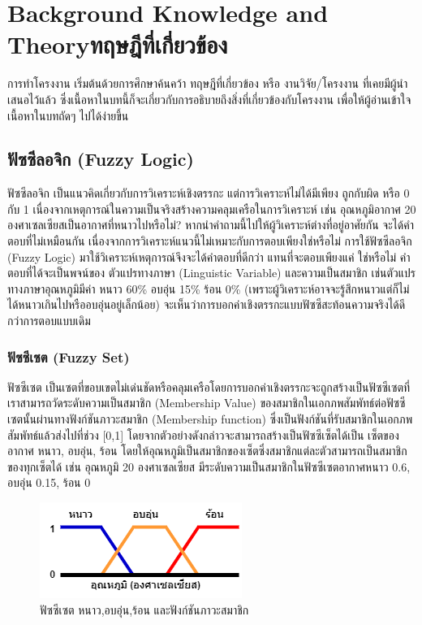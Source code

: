 \chapter{\ifenglish Background Knowledge and Theory\else ทฤษฎีที่เกี่ยวข้อง\fi}

การทำโครงงาน เริ่มต้นด้วยการศึกษาค้นคว้า ทฤษฎีที่เกี่ยวข้อง หรือ งานวิจัย/โครงงาน ที่เคยมีผู้นำเสนอไว้แล้ว ซึ่งเนื้อหาในบทนี้ก็จะเกี่ยวกับการอธิบายถึงสิ่งที่เกี่ยวข้องกับโครงงาน เพื่อให้ผู้อ่านเข้าใจเนื้อหาในบทถัดๆ ไปได้ง่ายขึ้น

\section{ฟัซซีลอจิก (Fuzzy Logic)}
ฟัซซีลอจิก \cite{Sansanee} เป็นแนวคิดเกี่ยวกับการวิเคราะห์เชิงตรรกะ แต่การวิเคราะห์ไม่ได้มีเพียง ถูกกับผิด หรือ 0 กับ 1 เนื่องจากเหตุการณ์ในความเป็นจริงสร้างความคลุมเครือในการวิเคราะห์ เช่น อุณหภูมิอากาศ 20 องศาเซลเซียสเป็นอากาศที่หนาวไปหรือไม่? หากนำคำถามนี้ไปให้ผู้วิเคราะห์ต่างที่อยู่อาศัยกัน จะได้คำตอบที่ไม่เหมือนกัน เนื่องจากการวิเคราะห์แนวนี้ไม่เหมาะกับการตอบเพียงใช่หรือไม่ การใช้ฟัซซีลอจิก (Fuzzy Logic) มาใช้วิเคราะห์เหตุการณ์จึงจะได้คำตอบที่ดีกว่า แทนที่จะตอบเพียงแค่ ใช่หรือไม่ คำตอบที่ได้จะเป็นพจน์ของ ตัวแปรทางภาษา (Linguistic Variable) และความเป็นสมาชิก เช่นตัวแปรทางภาษาอุณหภูมิมีค่า หนาว 60\% อบอุ่น 15\% ร้อน 0\% (เพราะผู้วิเคราะห์อาจจะรู้สึกหนาวแต่ก็ไม่ได้หนาวเกินไปหรืออบอุ่นอยู่เล็กน้อย) จะเห็นว่าการบอกค่าเชิงตรรกะแบบฟัซซีสะท้อนความจริงได้ดีกว่าการตอบแบบเดิม


\subsection{ฟัซซีเซต (Fuzzy Set)}
ฟัซซีเซต \cite{Zadeh} เป็นเซตที่ขอบเขตไม่เด่นชัดหรือคลุมเครือโดยการบอกค่าเชิงตรรกะจะถูกสร้างเป็นฟัซซีเซตที่เราสามารถวัดระดับความเป็นสมาชิก (Membership Value) ของสมาชิกในเอกภพสัมพัทธ์ต่อฟัซซีเซตนั้นผ่านทางฟังก์ชันภาวะสมาชิก (Membership function) \cite{Klir} ซึ่งเป็นฟังก์ชันที่รับสมาชิกในเอกภพสัมพัทธ์แล้วส่งไปที่ช่วง [0,1] โดยจากตัวอย่างดังกล่าวจะสามารถสร้างเป็นฟัซซีเซ็ตได้เป็น เซ็ตของอากาศ หนาว, อบอุ่น, ร้อน โดยให้อุณหภูมิเป็นสมาชิกของเซ็ตซึ่งสมาชิกแต่ละตัวสามารถเป็นสมาชิกของทุกเซ็ตได้ เช่น อุณหภูมิ 20 องศาเซลเซียส มีระดับความเป็นสมาชิกในฟัซซีเซตอากาศหนาว 0.6, อบอุ่น 0.15, ร้อน 0
\begin{figure}[ht]
    \centering
    \includegraphics[scale=0.7]{images/fuzzy_set.png}
    \caption{ฟัซซีเซต หนาว,อบอุ่น,ร้อน และฟังก์ชันภาวะสมาชิก}
    \label{fig:1}
\end{figure}

